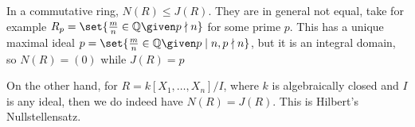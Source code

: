 In a commutative ring, $N(R)\leq J(R)$. They are in general not equal,
take for example $R_p = \set{\frac{m}{n} \in \mathbb{Q}\given p\nmid n}$ for
some prime $p$. This has a unique maximal ideal $p = \set{\frac{m}{n} \in \mathbb{Q}\given p\mid n, p \nmid n}$,
but it is an integral domain, so $N(R) = (0)$ while $J(R) = p$

On the other hand, for $R = k[X_1, \ldots, X_n]/I$, where $k$ is algebraically
closed and $I$ is any ideal, then we do indeed have $N(R) = J(R)$. This is
Hilbert's Nullstellensatz.
